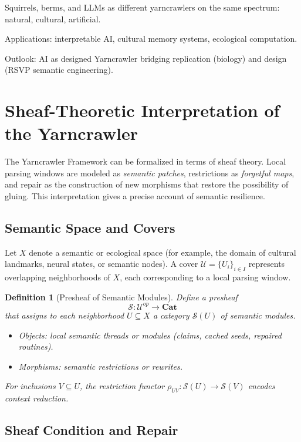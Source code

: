 \documentclass{article}
\newtheorem{definition}{Definition}
\begin{document}
Squirrels, berms, and LLMs as different yarncrawlers on the same spectrum: natural, cultural, artificial.

Applications: interpretable AI, cultural memory systems, ecological computation.

Outlook: AI as designed Yarncrawler bridging replication (biology) and design (RSVP semantic engineering).

\section{Sheaf-Theoretic Interpretation of the Yarncrawler}

The Yarncrawler Framework can be formalized in terms of sheaf theory. 
Local parsing windows are modeled as \emph{semantic patches}, restrictions as \emph{forgetful maps}, and repair as the construction of new morphisms that restore the possibility of gluing. 
This interpretation gives a precise account of semantic resilience.

\subsection{Semantic Space and Covers}

Let $X$ denote a semantic or ecological space (for example, the domain of cultural landmarks, neural states, or semantic nodes). 
A cover $\mathcal{U} = \{U_i\}_{i \in I}$ represents overlapping neighborhoods of $X$, each corresponding to a local parsing window.

\begin{definition}[Presheaf of Semantic Modules]
Define a presheaf
\[
\mathcal{S} : \mathcal{U}^{op} \to \mathbf{Cat}
\]
that assigns to each neighborhood $U \subseteq X$ a category $\mathcal{S}(U)$ of semantic modules. 
\begin{itemize}
  \item Objects: local semantic threads or modules (claims, cached seeds, repaired routines).
  \item Morphisms: semantic restrictions or rewrites.
\end{itemize}
For inclusions $V \subseteq U$, the restriction functor $\rho_{UV} : \mathcal{S}(U) \to \mathcal{S}(V)$ encodes context reduction.
\end{definition}

\subsection{Sheaf Condition and Repair}
\end{document}
